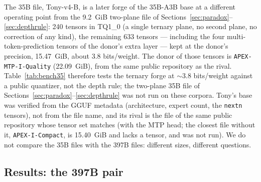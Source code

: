 \documentclass[10pt]{article} %
\begin{document}
The 35B file, Tony-v4-B,
is a later forge of the 35B-A3B base at a different operating point from the
9.2~GiB two-plane file of Sections~\ref{sec:paradox}--\ref{sec:depthrule}:
240 tensors in TQ1\_0 (a single ternary plane, no second plane, no
correction of any kind), the remaining 633 tensors --- including the four
multi-token-prediction tensors of the donor's extra layer --- kept at the
donor's precision, 15.47~GiB, about 3.8 bits/weight. The donor of those
tensors is \texttt{APEX-MTP-I-Quality} (22.09~GiB), from the same public
repository as the rival. Table~\ref{tab:bench35} therefore tests the ternary
forge at $\sim$3.8 bits/weight against a public quantizer, not the depth
rule; the two-plane 35B file of Sections~\ref{sec:paradox}--\ref{sec:depthrule}
was not run on these corpora. Tony's base was verified
from the GGUF metadata (architecture, expert count, the \texttt{nextn}
tensors), not from the file name, and its rival is the file of the same public
repository whose tensor set matches (with the MTP head; the closest file
without it, \texttt{APEX-I-Compact}, is 15.40~GiB and lacks a tensor, and was
not run). We do not
compare the 35B files with the 397B files: different sizes, different
questions.

\subsection{Results: the 397B pair}
\label{sec:bench397}
\end{document}
